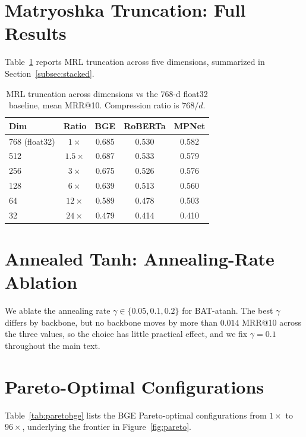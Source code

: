 \section{Matryoshka Truncation: Full Results}
\label{app:mrl}
Table~\ref{tab:mrlfull} reports MRL truncation across five dimensions,
summarized in Section~\ref{subsec:stacked}.

\begin{table}[h]
  \centering
  \caption{MRL truncation across dimensions vs the 768-d float32 baseline, mean
  MRR@10. Compression ratio is $768/d$.}
  \label{tab:mrlfull}
  \begin{tabular}{lcccc}
    \toprule
    \textbf{Dim} & \textbf{Ratio} & \textbf{BGE} & \textbf{RoBERTa} & \textbf{MPNet} \\
    \midrule
    768 (float32) & $1\times$   & 0.685 & 0.530 & 0.582 \\
    512           & $1.5\times$ & 0.687 & 0.533 & 0.579 \\
    256           & $3\times$   & 0.675 & 0.526 & 0.576 \\
    128           & $6\times$   & 0.639 & 0.513 & 0.560 \\
    64            & $12\times$  & 0.589 & 0.478 & 0.503 \\
    32            & $24\times$  & 0.479 & 0.414 & 0.410 \\
    \bottomrule
  \end{tabular}
\end{table}

\section{Annealed Tanh: Annealing-Rate Ablation}
\label{app:gamma}
We ablate the annealing rate $\gamma \in \{0.05, 0.1, 0.2\}$ for BAT-atanh. The
best $\gamma$ differs by backbone, but no backbone moves by more than $0.014$
MRR@10 across the three values, so the choice has little practical effect, and
we fix $\gamma = 0.1$ throughout the main text.

\section{Pareto-Optimal Configurations}
\label{app:pareto}
Table~\ref{tab:paretobge} lists the BGE Pareto-optimal configurations from
$1\times$ to $96\times$, underlying the frontier in Figure~\ref{fig:pareto}.

